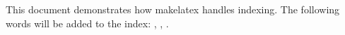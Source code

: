 \documentclass[letterpaper,12pt]{article}
\begin{document}
This document demonstrates how makelatex handles indexing. The following words will be added to the index: , , .

\lipsum[1-3]

\printindex
\end{document}
